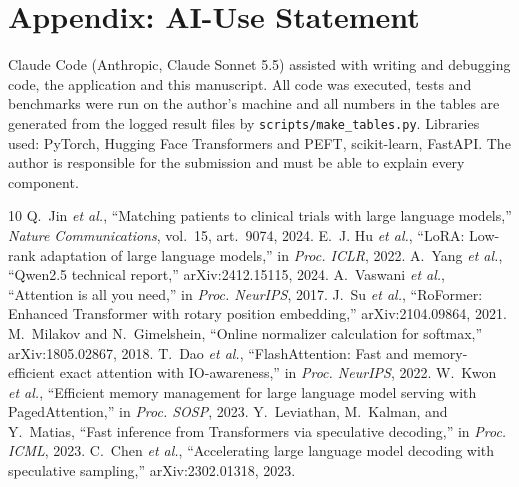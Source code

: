 \documentclass[conference]{IEEEtran}
\begin{document}
\section*{Appendix: AI-Use Statement}
Claude Code (Anthropic, Claude Sonnet 5.5) assisted with writing and debugging code, the application and this manuscript. All code was executed, tests and benchmarks were run on the author's machine and all numbers in the tables are generated from the logged result files by \texttt{scripts/make\_tables.py}. Libraries used: PyTorch, Hugging Face Transformers and PEFT, scikit-learn, FastAPI. The author is responsible for the submission and must be able to explain every component.

\begin{thebibliography}{10}
 Q.~Jin \emph{et al.}, ``Matching patients to clinical trials with large language models,'' \emph{Nature Communications}, vol.~15, art.~9074, 2024.
 E.~J. Hu \emph{et al.}, ``LoRA: Low-rank adaptation of large language models,'' in \emph{Proc. ICLR}, 2022.
 A.~Yang \emph{et al.}, ``Qwen2.5 technical report,'' arXiv:2412.15115, 2024.
 A.~Vaswani \emph{et al.}, ``Attention is all you need,'' in \emph{Proc. NeurIPS}, 2017.
 J.~Su \emph{et al.}, ``RoFormer: Enhanced Transformer with rotary position embedding,'' arXiv:2104.09864, 2021.
 M.~Milakov and N.~Gimelshein, ``Online normalizer calculation for softmax,'' arXiv:1805.02867, 2018.
 T.~Dao \emph{et al.}, ``FlashAttention: Fast and memory-efficient exact attention with IO-awareness,'' in \emph{Proc. NeurIPS}, 2022.
 W.~Kwon \emph{et al.}, ``Efficient memory management for large language model serving with PagedAttention,'' in \emph{Proc. SOSP}, 2023.
 Y.~Leviathan, M.~Kalman, and Y.~Matias, ``Fast inference from Transformers via speculative decoding,'' in \emph{Proc. ICML}, 2023.
 C.~Chen \emph{et al.}, ``Accelerating large language model decoding with speculative sampling,'' arXiv:2302.01318, 2023.
\end{thebibliography}
\end{document}
